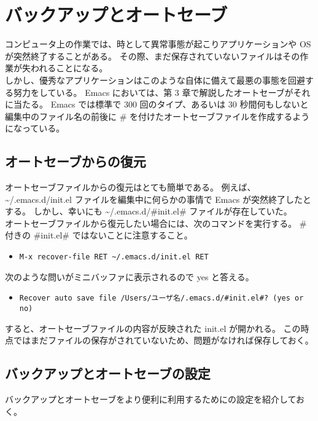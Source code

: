 \section{バックアップとオートセーブ}
コンピュータ上の作業では、時として異常事態が起こりアプリケーションや OS が突然終了することがある。
その際、まだ保存されていないファイルはその作業が失われることになる。\\

しかし、優秀なアプリケーションはこのような自体に備えて最悪の事態を回避する努力をしている。
Emacs においては、第 3 章で解説したオートセーブがそれに当たる。
Emacs では標準で 300 回のタイプ、あるいは 30 秒間何もしないと編集中のファイル名の前後に \# を付けたオートセーブファイルを作成するようになっている。
\subsection{オートセーブからの復元}
オートセーブファイルからの復元はとても簡単である。
例えば、\textasciitilde{}/.emacs.d/init.el ファイルを編集中に何らかの事情で Emacs が突然終了したとする。\enlargethispage{0.15zw}
しかし、幸いにも \textasciitilde{}/.emacs.d/\#init.el\# ファイルが存在していた。\\

オートセーブファイルから復元したい場合には、次のコマンドを実行する。
\# 付きの \#init.el\# ではないことに注意すること。
\begin{itemize}\setlength{\leftskip}{-1.00zw}%
\item[] \verb|M-x recover-file RET ~/.emacs.d/init.el RET|
\end{itemize}
次のような問いがミニバッファに表示されるので yes と答える。
\begin{itemize}\setlength{\leftskip}{-1.00zw}%
\item[] \texttt{Recover auto save file /Users/ユーザ名/.emacs.d/\#init.el\#? (yes or no)}
\end{itemize}
すると、オートセーブファイルの内容が反映された init.el が開かれる。
この時点ではまだファイルの保存がされていないため、問題がなければ保存しておく。
\subsection{バックアップとオートセーブの設定}
バックアップとオートセーブをより便利に利用するためにの設定を紹介しておく。
